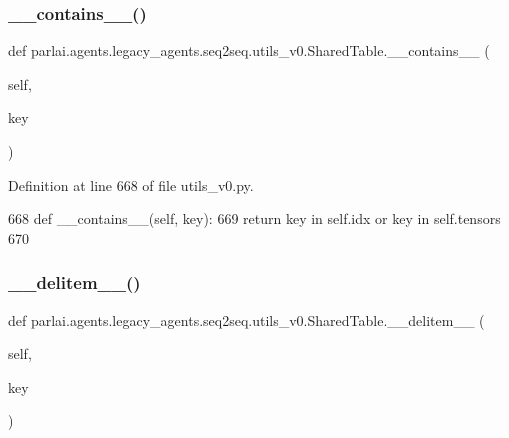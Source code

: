 \subsubsection{\texorpdfstring{\+\_\+\+\_\+contains\+\_\+\+\_\+()}{\_\_contains\_\_()}}
{\footnotesize\ttfamily def parlai.\+agents.\+legacy\+\_\+agents.\+seq2seq.\+utils\+\_\+v0.\+Shared\+Table.\+\_\+\+\_\+contains\+\_\+\+\_\+ (\begin{DoxyParamCaption}\item[{}]{self,  }\item[{}]{key }\end{DoxyParamCaption})}



Definition at line 668 of file utils\+\_\+v0.\+py.


\begin{DoxyCode}
668     \textcolor{keyword}{def }\_\_contains\_\_(self, key):
669         \textcolor{keywordflow}{return} key \textcolor{keywordflow}{in} self.idx \textcolor{keywordflow}{or} key \textcolor{keywordflow}{in} self.tensors
670 
\end{DoxyCode}
\mbox{\label{classparlai_1_1agents_1_1legacy__agents_1_1seq2seq_1_1utils__v0_1_1SharedTable_a9dec1e7ee1c932cec08159e26cd6b570}} 
\subsubsection{\texorpdfstring{\+\_\+\+\_\+delitem\+\_\+\+\_\+()}{\_\_delitem\_\_()}}
{\footnotesize\ttfamily def parlai.\+agents.\+legacy\+\_\+agents.\+seq2seq.\+utils\+\_\+v0.\+Shared\+Table.\+\_\+\+\_\+delitem\+\_\+\+\_\+ (\begin{DoxyParamCaption}\item[{}]{self,  }\item[{}]{key }\end{DoxyParamCaption})}



